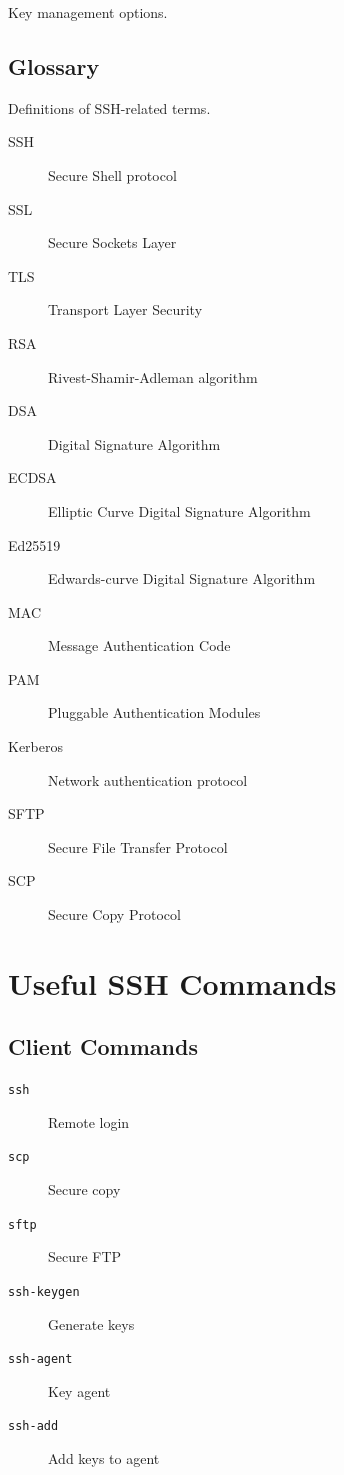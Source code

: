 \documentclass[12pt]{book}
\begin{document}
Key management options.

\section{Glossary}

Definitions of SSH-related terms.

\begin{description}
    \item[SSH] Secure Shell protocol
    \item[SSL] Secure Sockets Layer
    \item[TLS] Transport Layer Security
    \item[RSA] Rivest-Shamir-Adleman algorithm
    \item[DSA] Digital Signature Algorithm
    \item[ECDSA] Elliptic Curve Digital Signature Algorithm
    \item[Ed25519] Edwards-curve Digital Signature Algorithm
    \item[MAC] Message Authentication Code
    \item[PAM] Pluggable Authentication Modules
    \item[Kerberos] Network authentication protocol
    \item[SFTP] Secure File Transfer Protocol
    \item[SCP] Secure Copy Protocol
\end{description}

\backmatter

\appendix

\chapter{Useful SSH Commands}

\section{Client Commands}

\begin{description}
    \item[\texttt{ssh}] Remote login
    \item[\texttt{scp}] Secure copy
    \item[\texttt{sftp}] Secure FTP
    \item[\texttt{ssh-keygen}] Generate keys
    \item[\texttt{ssh-agent}] Key agent
    \item[\texttt{ssh-add}] Add keys to agent
\end{description}
\end{document}
